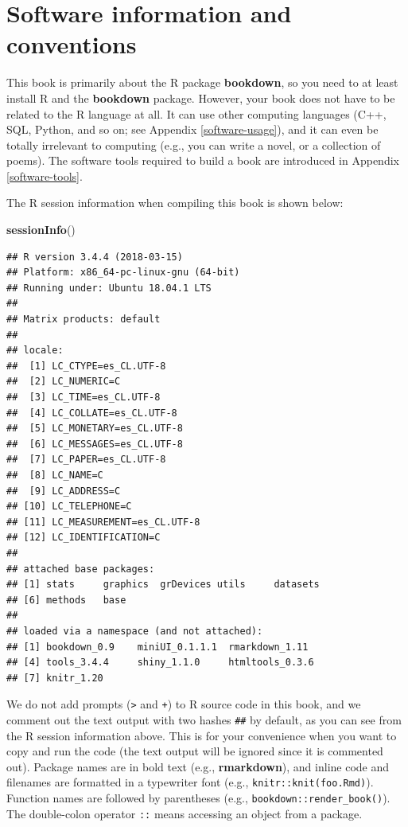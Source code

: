 \documentclass[12pt,]{krantz}
\newenvironment{Shaded}{\begin{snugshade}}{\end{snugshade}}
\newcommand{\KeywordTok}[1]{\textcolor[rgb]{0.13,0.29,0.53}{\textbf{#1}}}
\newcommand{\NormalTok}[1]{#1}
\begin{document}
\hypertarget{software-information-and-conventions}{%
\section*{Software information and conventions}\label{software-information-and-conventions}}


This book is primarily about the R package \textbf{bookdown}, so you need to at least install R and the \textbf{bookdown} package. However, your book does not have to be related to the R language at all. It can use other computing languages (C++, SQL, Python, and so on; see Appendix \ref{software-usage}), and it can even be totally irrelevant to computing (e.g., you can write a novel, or a collection of poems). The software tools required to build a book are introduced in Appendix \ref{software-tools}.

The R session information when compiling this book is shown below:

\begin{Shaded}
\begin{Highlighting}[]
\KeywordTok{sessionInfo}\NormalTok{()}
\end{Highlighting}
\end{Shaded}

\begin{verbatim}
## R version 3.4.4 (2018-03-15)
## Platform: x86_64-pc-linux-gnu (64-bit)
## Running under: Ubuntu 18.04.1 LTS
## 
## Matrix products: default
## 
## locale:
##  [1] LC_CTYPE=es_CL.UTF-8      
##  [2] LC_NUMERIC=C              
##  [3] LC_TIME=es_CL.UTF-8       
##  [4] LC_COLLATE=es_CL.UTF-8    
##  [5] LC_MONETARY=es_CL.UTF-8   
##  [6] LC_MESSAGES=es_CL.UTF-8   
##  [7] LC_PAPER=es_CL.UTF-8      
##  [8] LC_NAME=C                 
##  [9] LC_ADDRESS=C              
## [10] LC_TELEPHONE=C            
## [11] LC_MEASUREMENT=es_CL.UTF-8
## [12] LC_IDENTIFICATION=C       
## 
## attached base packages:
## [1] stats     graphics  grDevices utils     datasets 
## [6] methods   base     
## 
## loaded via a namespace (and not attached):
## [1] bookdown_0.9    miniUI_0.1.1.1  rmarkdown_1.11 
## [4] tools_3.4.4     shiny_1.1.0     htmltools_0.3.6
## [7] knitr_1.20
\end{verbatim}

We do not add prompts (\texttt{\textgreater{}} and \texttt{+}) to R source code in this book, and we comment out the text output with two hashes \texttt{\#\#} by default, as you can see from the R session information above. This is for your convenience when you want to copy and run the code (the text output will be ignored since it is commented out). Package names are in bold text (e.g., \textbf{rmarkdown}), and inline code and filenames are formatted in a typewriter font (e.g., \texttt{knitr::knit(\textquotesingle{}foo.Rmd\textquotesingle{})}). Function names are followed by parentheses (e.g., \texttt{bookdown::render\_book()}). The double-colon operator \texttt{::} means accessing an object from a package.
\end{document}
